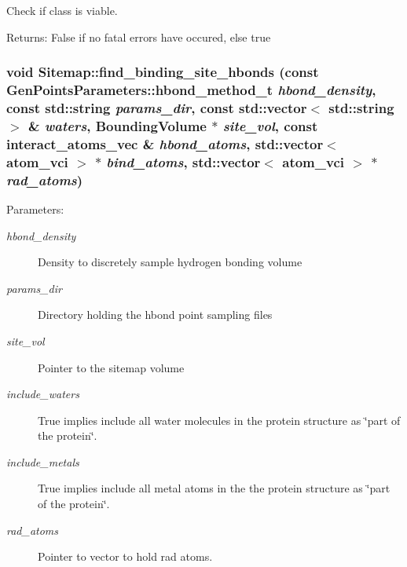 Check if class is viable. 

\begin{Desc}
\item[Returns:]False if no fatal errors have occured, else true \end{Desc}
\subsubsection{\setlength{\rightskip}{0pt plus 5cm}void Sitemap::find\_\-binding\_\-site\_\-hbonds (const \bf{Gen\-Points\-Parameters::hbond\_\-method\_\-t} {\em hbond\_\-density}, const std::string {\em params\_\-dir}, const std::vector$<$ std::string $>$ \& {\em waters}, \bf{Bounding\-Volume} $\ast$ {\em site\_\-vol}, const interact\_\-atoms\_\-vec \& {\em hbond\_\-atoms}, std::vector$<$ atom\_\-vci $>$ $\ast$ {\em bind\_\-atoms}, std::vector$<$ atom\_\-vci $>$ $\ast$ {\em rad\_\-atoms})\hspace{0.3cm}{\tt  [private]}}\label{classASCbase_1_1Sitemap_1c89cc76612ae6e252b459b4bf62bc13}


\begin{Desc}
\item[Parameters:]
\begin{description}
\item[{\em hbond\_\-density}]Density to discretely sample hydrogen bonding volume \item[{\em params\_\-dir}]Directory holding the hbond point sampling files \item[{\em site\_\-vol}]Pointer to the sitemap volume \item[{\em include\_\-waters}]True implies include all water molecules in the protein structure as \char`\"{}part of the protein\char`\"{}. \item[{\em include\_\-metals}]True implies include all metal atoms in the the protein structure as \char`\"{}part of the protein\char`\"{}. \item[{\em rad\_\-atoms}]Pointer to vector to hold rad atoms. \end{description}
\end{Desc}
